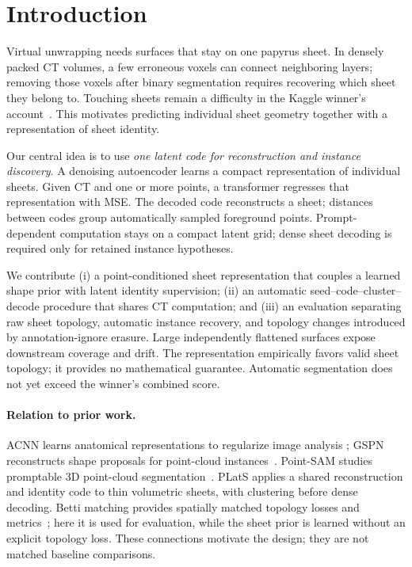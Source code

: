 \section{Introduction}
Virtual unwrapping needs surfaces that stay on one papyrus sheet. In densely
packed CT volumes, a few erroneous voxels can connect neighboring layers;
removing those voxels after binary segmentation requires recovering which
sheet they belong to. Touching sheets remain a difficulty in the Kaggle
winner's account~\cite{vesuviuswinner}. This motivates predicting individual
sheet geometry together with a representation of sheet identity.

Our central idea is to use \emph{one latent code for reconstruction and
instance discovery}. A denoising autoencoder learns a compact representation
of individual sheets. Given CT and one or more points, a transformer regresses
that representation with MSE. The decoded code reconstructs a sheet; distances
between codes group automatically sampled foreground points. Prompt-dependent
computation stays on a compact latent grid; dense sheet decoding is required
only for retained instance hypotheses.

We contribute (i) a point-conditioned sheet representation that couples a
learned shape prior with latent identity supervision; (ii) an automatic
seed--code--cluster--decode procedure that shares CT computation; and
(iii) an evaluation separating raw sheet topology, automatic instance
recovery, and topology changes introduced by annotation-ignore erasure.
Large independently flattened surfaces expose downstream coverage and drift.
The representation empirically favors valid sheet topology; it provides
no mathematical guarantee. Automatic segmentation does not yet exceed
the winner's combined score.

\paragraph{Relation to prior work.}
ACNN learns anatomical representations to regularize image analysis
\cite{oktay2017acnn}; GSPN reconstructs shape proposals for point-cloud
instances~\cite{yi2019gspn}. Point-SAM studies promptable 3D point-cloud
segmentation~\cite{zhou2024pointsam}. PLatS applies a shared reconstruction
and identity code to thin volumetric sheets, with clustering before dense
decoding. Betti matching provides spatially matched topology losses and
metrics~\cite{stucki2022betti}; here it is used for evaluation, while the
sheet prior is learned without an explicit topology loss. These connections
motivate the design; they are not matched baseline comparisons.
